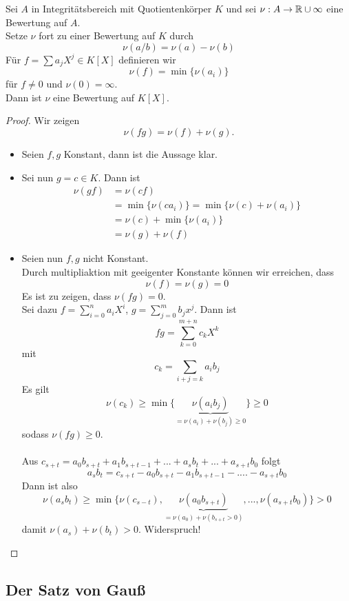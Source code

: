 	\begin{theorem}
		Sei $A$ in Integritätsbereich mit Quotientenkörper $K$ und sei $\nu:A\to\mathbb{R}\cup\infty$ eine Bewertung auf $A$.\\
		Setze $\nu$ fort zu einer Bewertung auf $K$ durch
		\[\nu(a/b)=\nu(a)-\nu(b)\]
		Für $f=\sum a_jX^j\in K[X]$ definieren wir
		\[\nu(f)=\min\{\nu(a_i)\}\]
		für $f\neq0$ und $\nu(0)=\infty$.\\
		Dann ist $\nu$ eine Bewertung auf $K[X]$.
	\end{theorem}
	\begin{proof}

		Wir zeigen
		\[\nu(fg)=\nu(f)+\nu(g).\]
		\begin{itemize}
			\item Seien $f,g$ Konstant, dann ist die Aussage klar.\\
			\item Sei nun $g=c\in K$. Dann ist 
				\begin{align*}
				\nu(gf)&=\nu(cf)\\
				&=\min\{\nu(ca_i)\}=\min\{\nu(c)+\nu(a_i)\}\\
				&=\nu(c)+\min\{\nu(a_i)\}\\
				&=\nu(g)+\nu(f)
				\end{align*}
			\item Seien nun $f,g$ nicht Konstant.\\
			Durch multipliaktion mit geeigenter Konstante können wir erreichen, dass 
			\[\nu(f)=\nu(g)=0\]
			Es ist zu zeigen, dass $\nu (fg)=0$.\\
			Sei dazu $f=\sum_{i=0}^{n}a_iX^i$, $g=\sum_{j=0}^mb_jx^j$. Dann ist
			\[fg=\sum_{k=0}^{m+n}c_kX^k\]
			mit
			\[c_k=\sum_{i+j=k}a_ib_j\]
			Es gilt
			\[\nu(c_k)\geq \min\{\underbrace{\nu(a_ib_j)}_{=\nu(a_i)+\nu(b_j)\geq 0}\}\geq 0\]
			sodass $\nu(fg)\geq 0$.\\
			\\
			Aus $c_{s+t}=a_0b_{s+t}+a_1b_{s+t-1}+...+a_sb_t+...+a_{s+t}b_0$ folgt
			\[a_sb_t=c_{s+t}-a_0b_{s+t}-a_1b_{s+t-1}-....-a_{s+t}b_0\]
			Dann ist also
			\[\nu(a_sb_t)\geq \min\{\nu(c_{s-t}),\underbrace{\nu(a_0b_{s+t})}_{=\nu(a_0)+\nu(b_{s+t}>0)},...,\nu(a_{s+t}b_0)\}>0\]
			damit $\nu(a_s)+\nu(b_t)>0$. Widerspruch!
		\end{itemize}
	\end{proof}

	\subsection{Der Satz von Gauß}

